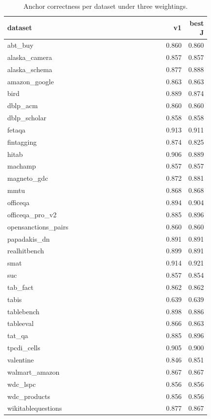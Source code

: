 \begin{table}[htbp]
\centering\scriptsize
\caption{Anchor correctness per dataset under three weightings.}
\label{tab:rho_per_dataset}
\setlength{\tabcolsep}{3pt}
\begin{tabular}{p{0.828\linewidth}rr}
\toprule
dataset & v1 & best J \\
\midrule
abt\_\allowbreak{}buy & 0.860 & 0.860 \\
alaska\_\allowbreak{}camera & 0.857 & 0.857 \\
alaska\_\allowbreak{}schema & 0.877 & 0.888 \\
amazon\_\allowbreak{}google & 0.863 & 0.863 \\
bird & 0.889 & 0.874 \\
dblp\_\allowbreak{}acm & 0.860 & 0.860 \\
dblp\_\allowbreak{}scholar & 0.858 & 0.858 \\
fetaqa & 0.913 & 0.911 \\
fintagging & 0.874 & 0.825 \\
hitab & 0.906 & 0.889 \\
machamp & 0.857 & 0.857 \\
magneto\_\allowbreak{}gdc & 0.872 & 0.881 \\
mmtu & 0.868 & 0.868 \\
officeqa & 0.894 & 0.904 \\
officeqa\_\allowbreak{}pro\_\allowbreak{}v2 & 0.885 & 0.896 \\
opensanctions\_\allowbreak{}pairs & 0.860 & 0.860 \\
papadakis\_\allowbreak{}dn & 0.891 & 0.891 \\
realhitbench & 0.899 & 0.891 \\
smat & 0.914 & 0.921 \\
suc & 0.857 & 0.854 \\
tab\_\allowbreak{}fact & 0.862 & 0.862 \\
tabis & 0.639 & 0.639 \\
tablebench & 0.898 & 0.886 \\
tableeval & 0.866 & 0.863 \\
tat\_\allowbreak{}qa & 0.885 & 0.896 \\
tpcdi\_\allowbreak{}cells & 0.905 & 0.900 \\
valentine & 0.846 & 0.851 \\
walmart\_\allowbreak{}amazon & 0.867 & 0.867 \\
wdc\_\allowbreak{}lspc & 0.856 & 0.856 \\
wdc\_\allowbreak{}products & 0.856 & 0.856 \\
wikitablequestions & 0.877 & 0.867 \\
\bottomrule
\end{tabular}
\end{table}
